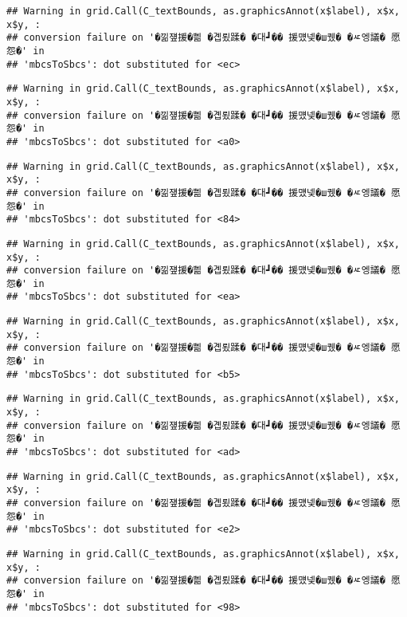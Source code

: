 \documentclass[
]{article}
\begin{document}
\begin{verbatim}
## Warning in grid.Call(C_textBounds, as.graphicsAnnot(x$label), x$x, x$y, :
## conversion failure on '�낆쟾援�쁾 �곕룄蹂� �대┛�� 援먰넻�ш퀬� �ㅼ엥議� 愿怨�' in
## 'mbcsToSbcs': dot substituted for <ec>
\end{verbatim}

\begin{verbatim}
## Warning in grid.Call(C_textBounds, as.graphicsAnnot(x$label), x$x, x$y, :
## conversion failure on '�낆쟾援�쁾 �곕룄蹂� �대┛�� 援먰넻�ш퀬� �ㅼ엥議� 愿怨�' in
## 'mbcsToSbcs': dot substituted for <a0>
\end{verbatim}

\begin{verbatim}
## Warning in grid.Call(C_textBounds, as.graphicsAnnot(x$label), x$x, x$y, :
## conversion failure on '�낆쟾援�쁾 �곕룄蹂� �대┛�� 援먰넻�ш퀬� �ㅼ엥議� 愿怨�' in
## 'mbcsToSbcs': dot substituted for <84>
\end{verbatim}

\begin{verbatim}
## Warning in grid.Call(C_textBounds, as.graphicsAnnot(x$label), x$x, x$y, :
## conversion failure on '�낆쟾援�쁾 �곕룄蹂� �대┛�� 援먰넻�ш퀬� �ㅼ엥議� 愿怨�' in
## 'mbcsToSbcs': dot substituted for <ea>
\end{verbatim}

\begin{verbatim}
## Warning in grid.Call(C_textBounds, as.graphicsAnnot(x$label), x$x, x$y, :
## conversion failure on '�낆쟾援�쁾 �곕룄蹂� �대┛�� 援먰넻�ш퀬� �ㅼ엥議� 愿怨�' in
## 'mbcsToSbcs': dot substituted for <b5>
\end{verbatim}

\begin{verbatim}
## Warning in grid.Call(C_textBounds, as.graphicsAnnot(x$label), x$x, x$y, :
## conversion failure on '�낆쟾援�쁾 �곕룄蹂� �대┛�� 援먰넻�ш퀬� �ㅼ엥議� 愿怨�' in
## 'mbcsToSbcs': dot substituted for <ad>
\end{verbatim}

\begin{verbatim}
## Warning in grid.Call(C_textBounds, as.graphicsAnnot(x$label), x$x, x$y, :
## conversion failure on '�낆쟾援�쁾 �곕룄蹂� �대┛�� 援먰넻�ш퀬� �ㅼ엥議� 愿怨�' in
## 'mbcsToSbcs': dot substituted for <e2>
\end{verbatim}

\begin{verbatim}
## Warning in grid.Call(C_textBounds, as.graphicsAnnot(x$label), x$x, x$y, :
## conversion failure on '�낆쟾援�쁾 �곕룄蹂� �대┛�� 援먰넻�ш퀬� �ㅼ엥議� 愿怨�' in
## 'mbcsToSbcs': dot substituted for <98>
\end{verbatim}
\end{document}
